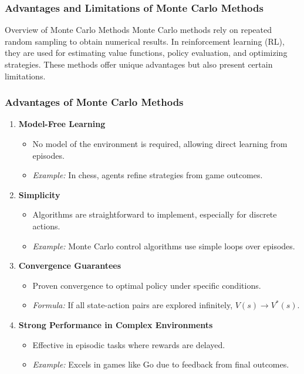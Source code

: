 \documentclass[aspectratio=169]{beamer}
\begin{document}
\begin{frame}[fragile]
    \frametitle{Advantages and Limitations of Monte Carlo Methods}
    \begin{block}{Overview of Monte Carlo Methods}
        Monte Carlo methods rely on repeated random sampling to obtain numerical results.
        In reinforcement learning (RL), they are used for estimating value functions,
        policy evaluation, and optimizing strategies. These methods offer unique advantages
        but also present certain limitations.
    \end{block}
\end{frame}

\begin{frame}[fragile]
    \frametitle{Advantages of Monte Carlo Methods}
    \begin{enumerate}
        \item \textbf{Model-Free Learning} 
        \begin{itemize}
            \item No model of the environment is required, allowing direct learning from episodes.
            \item \textit{Example:} In chess, agents refine strategies from game outcomes.
        \end{itemize}
        
        \item \textbf{Simplicity} 
        \begin{itemize}
            \item Algorithms are straightforward to implement, especially for discrete actions.
            \item \textit{Example:} Monte Carlo control algorithms use simple loops over episodes.
        \end{itemize}
        
        \item \textbf{Convergence Guarantees} 
        \begin{itemize}
            \item Proven convergence to optimal policy under specific conditions.
            \item \textit{Formula:} If all state-action pairs are explored infinitely, \( V(s) \to V^*(s) \).
        \end{itemize}
        
        \item \textbf{Strong Performance in Complex Environments} 
        \begin{itemize}
            \item Effective in episodic tasks where rewards are delayed.
            \item \textit{Example:} Excels in games like Go due to feedback from final outcomes.
        \end{itemize}
    \end{enumerate}
\end{frame}
\end{document}
